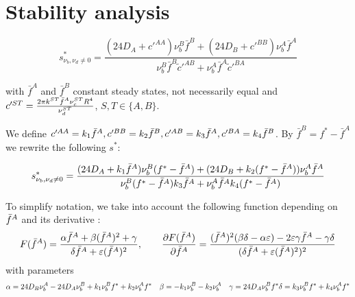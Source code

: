 \section{Stability analysis}


\begin{equation}
s^{*}_{\nu_b,\nu_d \ne 0}=\frac{(24 D_A+c'^{AA})\nu_{b}^{B}\bar{f}^{B}+(24 D_B+c'^{BB})\nu_{b}^{A}\bar{f}^A}{\nu_{b}^{B}\bar{f}^B\tilde{c}'^{AB}+\nu_{b}^{A}\bar{f}^A\tilde{c}'^{BA}}
\end{equation}

with $\bar{f}^A$ and $\bar{f}^B$ constant steady states, not necessarily equal and 
$c'^{ST}=\frac{2\pi k^{ST} {\bar{f}^A} \nu_c^{ST} R^{4}}{\nu_d^{ST}}$, $S,T \in \{ A,B \}$.

We define $c'^{AA}=k_1 {\bar{f}^A}, c'^{BB}=k_2{\bar{f}^B}, c'^{AB}=k_3{\bar{f}^A}, c'^{BA}=k_4{\bar{f}^B}$.
By $\bar{f}^B=f^*-\bar{f}^A$ we rewrite the following $s^*$:

\begin{equation}
s^{*}_{\nu_b,\nu_d \ne 0}=\frac{(24 D_A+k_1{\bar{f}^A})\nu_{b}^{B}(f^*-{\bar{f}^A})+(24 D_B+k_2(f^*-{\bar{f}^A}))\nu_{b}^{A}\bar{f}^A}{\nu_{b}^{B}(f^*-{\bar{f}^A})k_3{\bar{f}^A}+\nu_{b}^{A}\bar{f}^Ak_4(f^*-{\bar{f}^A})}
\end{equation}

To simplify notation, we take into account the following function depending on ${\bar{f}^A}$ and its derivative :
$$F({\bar{f}^A})=\frac{{\alpha} {\bar{f}^A} + {\beta} ({\bar{f}^A})^2 + {\gamma}}{{\delta} {\bar{f}^A} + \varepsilon({\bar{f}^A})^2}, \quad\quad 
\frac{{\partial} F({\bar{f}^A})}{{\partial} {\bar{f}^A}}=\frac{({\bar{f}^A})^2({\beta} {\delta}-{\alpha} \varepsilon)-2\varepsilon {\gamma} {\bar{f}^A} - {\gamma}{\delta}}{({\delta} {\bar{f}^A}+\varepsilon ({\bar{f}^A})^2)^2}$$ 
with parameters 
\begin{equation}
{\alpha}= 24D_B \nu_b^A -24 D_A \nu_b^B +k_1 \nu_b^B f^* + k_2 \nu_b^A f^* \quad
{\beta}=-k_1 \nu_b^B -k_2 \nu_b^A \quad
{\gamma}= 24 D_A \nu_b^B f^*
{\delta}= k_3\nu_b^B f^*+k_4 \nu_b^A f^*
\end{equation}




